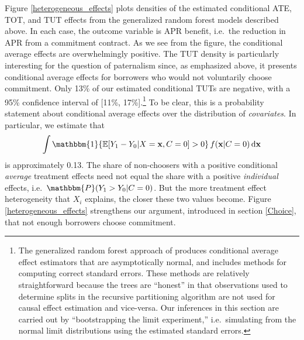 \documentclass[oneside,11pt]{article}
\begin{document}
Figure \ref{heterogeneous_effects} plots densities of the estimated conditional ATE, TOT, and TUT effects from the generalized random forest models described above.
In each case, the outcome variable is APR benefit, i.e.\ the reduction in APR from a commitment contract.
As we see from the figure, the conditional average effects are overwhelmingly positive. 
The TUT density is particularly interesting for the question of paternalism since, as emphasized above, it presents conditional average effects for borrowers who would not voluntarily choose commitment.
Only 13\% of our estimated conditional TUTs are negative, with a 95\% confidence interval of [11\%, 17\%].\footnote{The generalized random forest approach of \cite{atheygrf} produces conditional average effect estimators that are asymptotically normal, and includes methods for computing correct standard errors. These methods are relatively straightforward because the trees are ``honest'' in that observations used to determine splits in the recursive partitioning algorithm are not used for causal effect estimation and vice-versa. Our inferences in this section are carried out by ``bootstrapping the limit experiment,'' i.e.\ simulating from the normal limit distributions using the estimated standard errors.} 
To be clear, this is a probability statement about conditional average effects over the distribution of \emph{covariates}.
In particular, we estimate that   
\[
\int \mathbbm{1}\{\mathbb{E}[Y_1 - Y_0| X = \mathbf{x}, C = 0] > 0\} \, f(\mathbf{x}|C=0) \, \mathrm{d}\mathbf{x} 
\]
is approximately 0.13.
The share of non-choosers with a positive conditional \emph{average} treatment effects need not equal the share with a positive \emph{individual} effects, i.e.\ $\mathbbm{P}(Y_1 > Y_0| C = 0)$.
But the more treatment effect heterogeneity that $X_i$ explains, the closer these two values become.
Figure \ref{heterogeneous_effects} strengthens our argument, introduced in section \ref{Choice}, that not enough borrowers choose commitment. 
\end{document}
